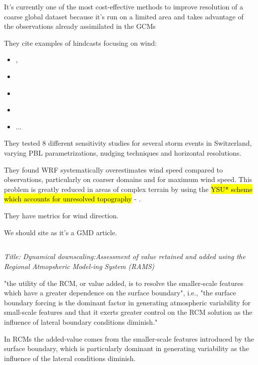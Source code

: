 \documentclass[12pt,a4paper]{article}
\begin{document}
It's currently one of the most cost-effective methods to improve resolution of a coarse global dataset because it's run on a limited area and takes advantage of the observations already assimilated in the GCMs

They cite examples of hindcasts focusing on wind: 

\begin{itemize}
    \item \cite{Jimenez2010}, 
    \item \cite{Garcia-Diez2015}
    \item \cite{Menendez2014}
    \item \cite{Lorente-Plazas2015}
    \item ...
\end{itemize}

They tested 8 different sensitivity studies for several storm events in Switzerland, varying PBL parametrizations, nudging techniques and horizontal resolutions.

They found WRF systematically overestimates wind speed compared to observations, particularly on coarser domains and for maximum wind speed. This problem is greatly reduced in areas of complex terrain by using the \hl{YSU* scheme which accounts for unresolved topography} - \cite{Jimenez2013}. 

They have metrics for wind direction.

We should site as it's a GMD article.

\subsection{\cite{Castro2005}}

\textit{Title: Dynamical downscaling:Assessment of value retained and added using the Regional Atmopsheric Model-ing System (RAMS)}

"the utility of the RCM, or value added, is to resolve the smaller-scale features which have a greater dependence on the surface boundary", i.e., "the surface boundary forcing is the dominant factor in generating atmospheric variability for small-scale features and that it exerts greater control on the RCM solution as the influence of lateral boundary conditions diminish."

In RCMs the added-value comes from the smaller-scale features introduced by the surface boundary, which is particularly dominant in generating variability as the influence of the lateral conditions diminish. 
\end{document}
